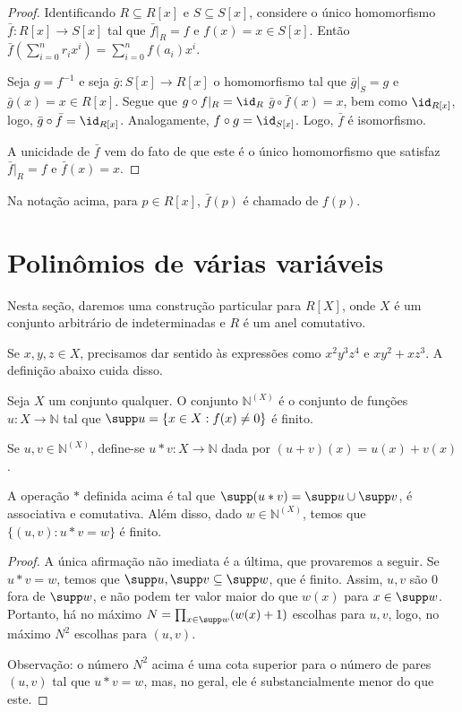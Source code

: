\begin{proof}
    Identificando $R\subseteq R[x]$ e $S\subseteq S[x]$, considere o único homomorfismo $\bar f:R[x]\rightarrow S[x]$ tal que $\bar f|_R=f$ e $f(x)=x\in S[x]$. Então $\bar f(\sum_{i=0}^n r_ix^i)=\sum_{i=0}^nf(a_i)x^i$.

    Seja $g=f^{-1}$ e seja $\bar g:S[x]\rightarrow R[x]$ o homomorfismo tal que $\bar g|_S=g$ e $\bar g(x)=x\in R[x]$. Segue que $g\circ f|_R=\id_R$ $\bar g\circ \bar f(x)=x$, bem como $\id_{R[x]}$, logo, $\bar g\circ \bar f=\id_{R[x]}$. Analogamente, $f\circ g=\id_{S[x]}$.
    Logo, $\bar f$ é isomorfismo.

    A unicidade de $\bar f$ vem do fato de que este é o único homomorfismo que satisfaz $\bar f|_R=f$ e $\bar f(x)=x$.
\end{proof}

\begin{definition}
    Na notação acima, para $p \in R[x]$, $\bar f(p)$ é chamado de $f(p)$.
\end{definition}
\section{Polinômios de várias variáveis}
Nesta seção, daremos uma construção particular para $R[X]$, onde $X$ é um conjunto arbitrário de indeterminadas e $R$ é um anel comutativo.

Se $x, y, z \in X$, precisamos dar sentido às expressões como $x^2y^3z^4$ e $xy^2+xz^3$. A definição abaixo cuida disso.

\begin{definition}
    Seja $X$ um conjunto qualquer. O conjunto $\mathbb N^{(X)}$ é o conjunto de funções $u:X\rightarrow \mathbb N$ tal que $\supp u=\{x \in X: f(x)\neq 0\}$ é finito.

    Se $u, v \in \mathbb N^{(X)}$, define-se $u*v:X\rightarrow \mathbb N$ dada por $(u+v)(x)=u(x)+v(x)$.
\end{definition}

\begin{lemma}
    A operação $*$ definida acima é tal que $\supp(u*v)= \supp u \cup \supp v$, é associativa e comutativa. Além disso, dado $w \in \mathbb N^{(X)}$, temos que $\{(u, v): u*v=w\}$ é finito.
\end{lemma}
\begin{proof}
    A única afirmação não imediata é a última, que provaremos a seguir.
    Se $u*v=w$, temos que $\supp u, \supp v\subseteq \supp w$, que é finito. Assim, $u, v$ são $0$ fora de $\supp w$, e não podem ter valor maior do que $w(x)$ para $x\in \supp w$.
    Portanto, há no máximo $N=\prod_{x \in \supp w}(w(x)+1)$ escolhas para $u, v$, logo, no máximo $N^2$ escolhas para $(u, v)$.

    Observação: o número $N^2$ acima é uma cota superior para o número de pares $(u, v)$ tal que $u*v=w$, mas, no geral, ele é substancialmente menor do que este.
\end{proof}

